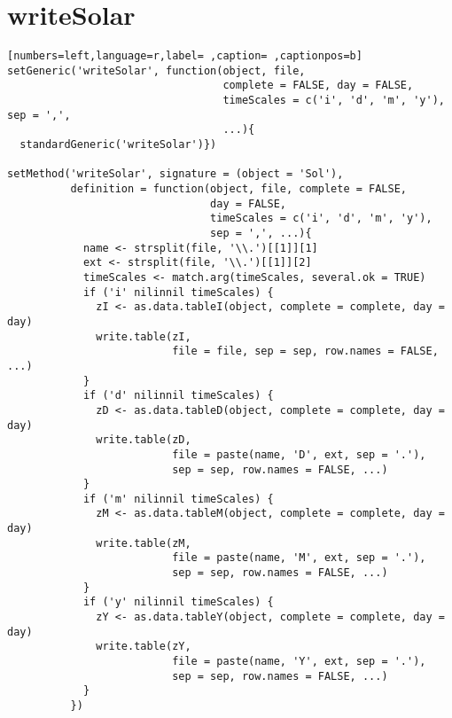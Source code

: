 \section{writeSolar}
\label{sec:orgb086f63}
\begin{lstlisting}[numbers=left,language=r,label= ,caption= ,captionpos=b]
setGeneric('writeSolar', function(object, file,
                                  complete = FALSE, day = FALSE,
                                  timeScales = c('i', 'd', 'm', 'y'), sep = ',',
                                  ...){
  standardGeneric('writeSolar')})

setMethod('writeSolar', signature = (object = 'Sol'),
          definition = function(object, file, complete = FALSE,
                                day = FALSE,
                                timeScales = c('i', 'd', 'm', 'y'),
                                sep = ',', ...){
            name <- strsplit(file, '\\.')[[1]][1]
            ext <- strsplit(file, '\\.')[[1]][2]
            timeScales <- match.arg(timeScales, several.ok = TRUE)
            if ('i' nilinnil timeScales) {
              zI <- as.data.tableI(object, complete = complete, day = day)
              write.table(zI,
                          file = file, sep = sep, row.names = FALSE, ...)
            }
            if ('d' nilinnil timeScales) {
              zD <- as.data.tableD(object, complete = complete, day = day)
              write.table(zD,
                          file = paste(name, 'D', ext, sep = '.'),
                          sep = sep, row.names = FALSE, ...)
            }
            if ('m' nilinnil timeScales) {
              zM <- as.data.tableM(object, complete = complete, day = day)
              write.table(zM,
                          file = paste(name, 'M', ext, sep = '.'),
                          sep = sep, row.names = FALSE, ...)
            }
            if ('y' nilinnil timeScales) {
              zY <- as.data.tableY(object, complete = complete, day = day)
              write.table(zY,
                          file = paste(name, 'Y', ext, sep = '.'),
                          sep = sep, row.names = FALSE, ...)
            }
          })
\end{lstlisting}
